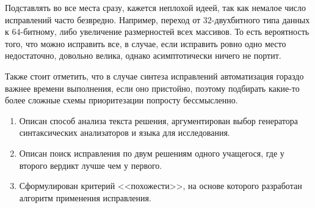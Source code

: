 Подставлять во все места сразу, кажется неплохой идеей, так как немалое число исправлений часто безвредно.
Например, переход от $32$-двухбитного типа данных к $64$-битному, либо увеличение размерностей всех массивов.
То есть вероятность того, что можно исправить все, в случае, если исправить ровно одно место недостаточно, довольно велика,
однако асимптотически ничего не портит.

Также стоит отметить, что в случае синтеза исправлений автоматизация гораздо важнее времени выполнения, если оно пристойно, поэтому
подбирать какие-то более сложные схемы приоритезации попросту бессмысленно.

\chapterconclusion

\begin{enumerate}
    \item Описан способ анализа текста решения, аргументирован выбор генератора синтаксических анализаторов и языка для исследования.
    \item Описан поиск исправления по двум решениям одного учащегося, где у второго вердикт лучше чем у первого.
    \item Сформулирован критерий <<похожести>>, на основе которого разработан алгоритм применения исправления.
\end{enumerate}
